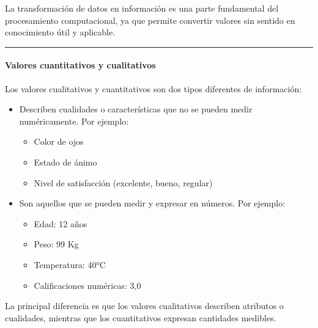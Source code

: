\documentclass[letterpaper,10pt,spanish]{sphinxmanual}
\begin{document}
\sphinxAtStartPar
La transformación de datos en información es una parte fundamental del procesamiento computacional, ya que permite convertir valores sin sentido en conocimiento útil y aplicable.


\bigskip\hrule\bigskip



\paragraph{Valores cuantitativos y cualitativos}
\label{\detokenize{cursos/ofimatica11/recursos/T01:valores-cuantitativos-y-cualitativos}}
\sphinxAtStartPar
\sphinxfootnotemark[1] Los valores cualitativos y cuantitativos son dos tipos diferentes de información:
\begin{itemize}
\item {} 
\sphinxAtStartPar
{} Describen cualidades o características que no se pueden medir numéricamente. Por ejemplo:
\begin{itemize}
\item {} 
\sphinxAtStartPar
Color de ojos

\item {} 
\sphinxAtStartPar
Estado de ánimo

\item {} 
\sphinxAtStartPar
Nivel de satisfacción (excelente, bueno, regular)

\end{itemize}

\item {} 
\sphinxAtStartPar
{} Son aquellos que se pueden medir y expresar en números. Por ejemplo:
\begin{itemize}
\item {} 
\sphinxAtStartPar
Edad: 12 años

\item {} 
\sphinxAtStartPar
Peso: 99 Kg

\item {} 
\sphinxAtStartPar
Temperatura: 40°C

\item {} 
\sphinxAtStartPar
Calificaciones numéricas: 3,0

\end{itemize}

\end{itemize}

\sphinxAtStartPar
La principal diferencia es que los valores cualitativos describen atributos o cualidades, mientras que los cuantitativos expresan cantidades medibles.
\end{document}
